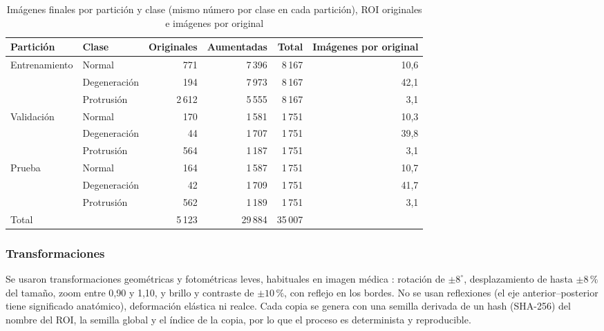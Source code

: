 \begin{table}[t]
\centering\footnotesize
\caption{Imágenes finales por partición y clase (mismo número por clase en cada partición), ROI originales e imágenes por original}
\label{tab:35k}
\begin{tabular}{llrrrr}
\toprule
Partición & Clase & Originales & Aumentadas & Total & Imágenes por original \\
\midrule
Entrenamiento & Normal       & 771    & 7\,396 & 8\,167 & 10,6 \\
              & Degeneración & 194    & 7\,973 & 8\,167 & 42,1 \\
              & Protrusión   & 2\,612 & 5\,555 & 8\,167 & 3,1  \\
Validación    & Normal       & 170    & 1\,581 & 1\,751 & 10,3 \\
              & Degeneración & 44     & 1\,707 & 1\,751 & 39,8 \\
              & Protrusión   & 564    & 1\,187 & 1\,751 & 3,1  \\
Prueba        & Normal       & 164    & 1\,587 & 1\,751 & 10,7 \\
              & Degeneración & 42     & 1\,709 & 1\,751 & 41,7 \\
              & Protrusión   & 562    & 1\,189 & 1\,751 & 3,1  \\
\midrule
Total         &              & 5\,123 & 29\,884 & 35\,007 & \\
\bottomrule
\end{tabular}
\end{table}

\subsubsection{Transformaciones}
Se usaron transformaciones geométricas y fotométricas leves, habituales en imagen médica \cite{islam2024}: rotación de $\pm 8^{\circ}$, desplazamiento de hasta $\pm 8\,\%$ del tamaño, zoom entre 0,90 y 1,10, y brillo y contraste de $\pm 10\,\%$, con reflejo en los bordes. No se usan reflexiones (el eje anterior--posterior tiene significado anatómico), deformación elástica ni realce. Cada copia se genera con una semilla derivada de un hash (SHA-256) del nombre del ROI, la semilla global y el índice de la copia, por lo que el proceso es determinista y reproducible.

